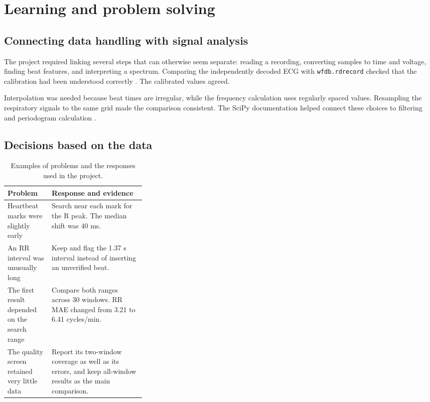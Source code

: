 \chapter{Learning and problem solving}\label{ch:9}

\section{Connecting data handling with signal analysis}

The project required linking several steps that can otherwise seem separate: reading a recording, converting samples to time and voltage, finding beat features, and interpreting a spectrum. Comparing the independently decoded ECG with \texttt{wfdb.rdrecord} checked that the calibration had been understood correctly \cite{signalformat,wfdbio}. The calibrated values agreed.

Interpolation was needed because beat times are irregular, while the frequency calculation uses regularly spaced values. Resampling the respiratory signals to the same grid made the comparison consistent. The SciPy documentation helped connect these choices to filtering and periodogram calculation \cite{periodogram,resamplepoly}.

\section{Decisions based on the data}

\begin{table}[H]
\centering
\caption{Examples of problems and the responses used in the project.}
\small
\begin{tabularx}{\linewidth}{@{}p{0.32\linewidth}X@{}}
\toprule
\textbf{Problem} & \textbf{Response and evidence} \\
\midrule
Heartbeat marks were slightly early & Search near each mark for the R peak. The median shift was 40 ms. \\
An RR interval was unusually long & Keep and flag the 1.37 s interval instead of inserting an unverified beat. \\
The first result depended on the search range & Compare both ranges across 30 windows. RR MAE changed from 3.21 to 6.41 cycles/min. \\
The quality screen retained very little data & Report its two-window coverage as well as its errors, and keep all-window results as the main comparison. \\
\bottomrule
\end{tabularx}
\end{table}

